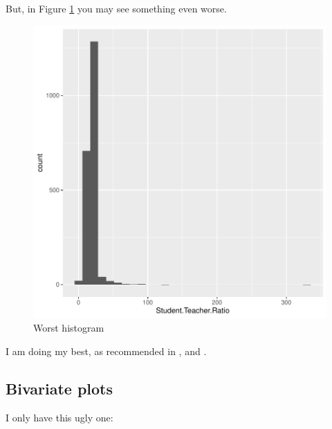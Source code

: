 \documentclass[a4paper, 12pt]{article}
\begin{document}
But, in Figure \ref{fig:theDeli_2} you may see something even worse.

\begin{figure}[h]
\centering
\includegraphics{draft_paper_v2-theDeli_2}
\caption{Worst histogram}  %
\label{fig:theDeli_2} %
\end{figure}
I am doing my best, as recommended in \citet{magallanes_reyes_data_2022}, and \citet{leisch_sweave_2024}. 

\subsection{Bivariate plots}

I only have this ugly one:
\end{document}
